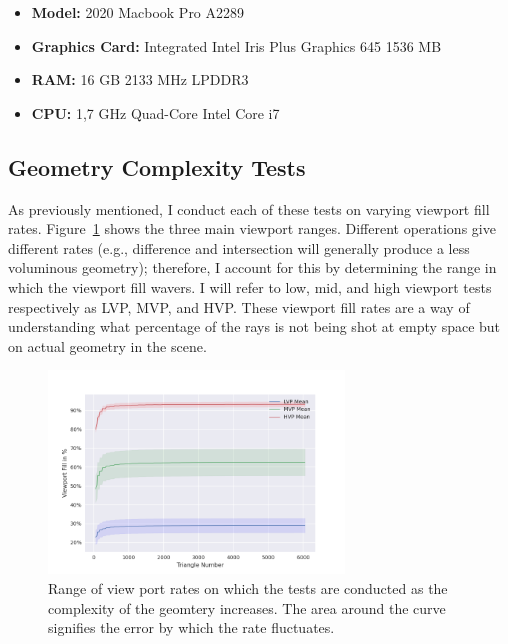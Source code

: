 \documentclass[a4paper,11pt,oneside]{article}
\begin{document}
\begin{itemize}
	\item \textbf{Model:} 2020 Macbook Pro A2289
	\item \textbf{Graphics Card:} Integrated Intel Iris Plus Graphics 645 1536 MB
	\item \textbf{RAM:} 16 GB 2133 MHz LPDDR3
	\item \textbf{CPU:} 1,7 GHz Quad-Core Intel Core i7
\end{itemize}


\subsection{Geometry Complexity Tests}

As previously mentioned, I conduct each of these tests on varying viewport fill rates. Figure~\ref{sec5.1:viewport_range} shows the three main viewport ranges. Different operations give different rates (e.g., difference and intersection will generally produce a less voluminous geometry); therefore, I account for this by determining the range in which the viewport fill wavers. I will refer to low, mid, and high viewport tests respectively as LVP, MVP, and HVP. These viewport fill rates are a way of understanding what percentage of the rays is not being shot at empty space but on actual geometry in the scene. 

\begin{figure}[ht] 
	\begin{center}
		\includegraphics[width=0.7\textwidth]{section5/plots/view_port_final.png}
	\end{center}
	\caption{Range of view port rates on which the tests are conducted as the complexity of the geomtery increases. The area around the curve signifies the error by which the rate fluctuates.}
	\label{sec5.1:viewport_range}
\end{figure}
\end{document}
